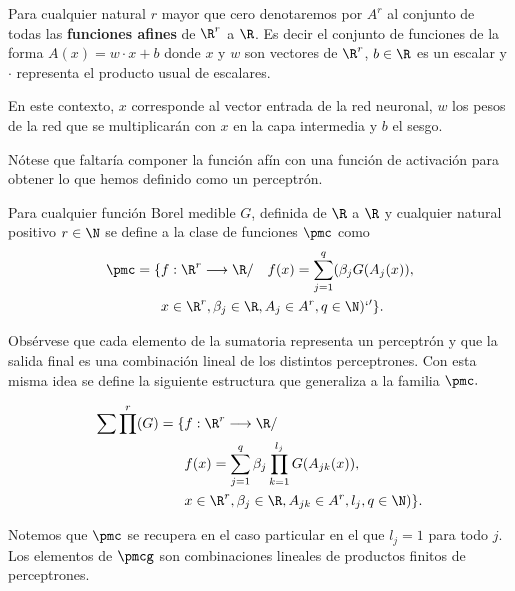     Para cualquier natural $r$ mayor que cero  denotaremos por $A^r$ al conjunto de todas 
    las \textbf{funciones afines} de $\R^r$ a $\R$. Es decir el conjunto de funciones de la forma 
    $A(x) = w \cdot x + b$ donde $x$ y $w$ son vectores de $\R^r$,  $b \in \R$ es un escalar y $\cdot$ representa el producto 
    usual de escalares.  
    


En este contexto, $x$ corresponde al vector entrada de la red neuronal, $w$ los pesos de la red
que se multiplicarán con $x$ en la capa intermedia y $b$ el sesgo. 

Nótese que faltaría componer la función afín con una función de activación para obtener lo que hemos definido 
como un perceptrón. 

\begin{definicion} 
    Para cualquier función Borel medible $G$, definida de $\R$ a $\R$ y cualquier natural positivo
    $r \in \N$ se define a la clase de funciones $\pmc$ como 
    \begin{equation}
        \begin{split}
        \pmc = 
        \{ 
            & f: \R ^r \longrightarrow \R / \quad
            f(x)=\sum_{j = 1} ^q (
            \beta_j G(A_{j}(x)), \\
            & x  \in \R ^r, \beta_j \in \R, A_{j}\in A^r,q \in \N
            )`'
        \}.
        \end{split}
    \end{equation}
\end{definicion}


Obsérvese que cada elemento de la sumatoria representa un perceptrón y que la salida final 
es una combinación lineal de los distintos perceptrones. Con esta misma idea 
se define la siguiente estructura que generaliza a la familia $\pmc.$  
   
\begin{definicion} 
    
    \begin{equation} 
        \begin{split}
        \sum \prod^r(G) = \{ 
        &f: \R^r \longrightarrow \R /\\
        & f(x) = \sum_{j = 1} ^q  \beta_j \prod_{k=1}^{l_j}
        G(A_{jk}(x)), \\
        &x  \in \R^r, \beta_j \in \R, A_{jk}\in A^r, l_j,q \in \N
        )
        \}.
    \end{split}
    \end{equation}  

    Notemos que $\pmc$ se recupera en el caso particular en el que $l_j = 1$ para todo $j$.
    Los elementos de $\pmcg$ son combinaciones lineales de productos finitos de perceptrones. 

\end{definicion}


